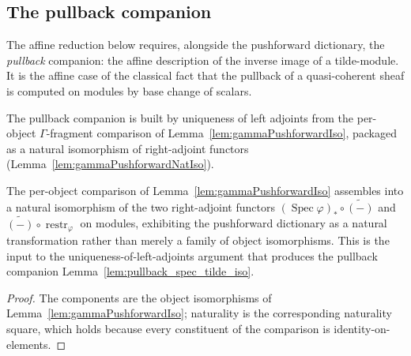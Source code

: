 \subsection{The pullback companion}

The affine reduction below requires, alongside the pushforward dictionary, the
\emph{pullback} companion: the affine description of the inverse image of a
tilde-module. It is the affine case of the classical fact that the pullback of a
quasi-coherent sheaf is computed on modules by base change of scalars.

The pullback companion is built by uniqueness of left adjoints from the
per-object \(\Gamma\)-fragment comparison of
Lemma~\ref{lem:gammaPushforwardIso}, packaged as a natural isomorphism of
right-adjoint functors (Lemma~\ref{lem:gammaPushforwardNatIso}).

\begin{lemma}



  \label{lem:gammaPushforwardNatIso}
  The per-object comparison of Lemma~\ref{lem:gammaPushforwardIso} assembles into a
  natural isomorphism of the two right-adjoint functors
  \((\operatorname{Spec}\varphi)_* \circ \widetilde{(-)}\) and
  \(\widetilde{(-)} \circ \operatorname{restr}_\varphi\) on modules, exhibiting the
  pushforward dictionary as a natural transformation rather than merely a family of
  object isomorphisms. This is the input to the uniqueness-of-left-adjoints argument
  that produces the pullback companion Lemma~\ref{lem:pullback_spec_tilde_iso}.
\end{lemma}
\begin{proof}
  The components are the object isomorphisms of Lemma~\ref{lem:gammaPushforwardIso};
  naturality is the corresponding naturality square, which holds because every
  constituent of the comparison is identity-on-elements.
\end{proof}

